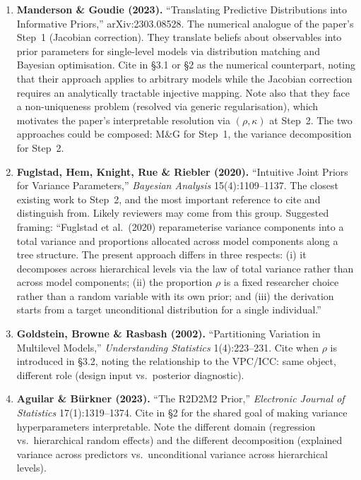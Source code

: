 \documentclass[12pt,a4paper]{article}
\begin{document}
\begin{enumerate}
  \item \textbf{Manderson \& Goudie (2023).} ``Translating Predictive
    Distributions into Informative Priors,'' arXiv:2303.08528. The numerical
    analogue of the paper's Step~1 (Jacobian correction). They translate
    beliefs about observables into prior parameters for single-level models via
    distribution matching and Bayesian optimisation. Cite in \S3.1 or \S2 as
    the numerical counterpart, noting that their approach applies to arbitrary
    models while the Jacobian correction requires an analytically tractable
    injective mapping. Note also that they face a non-uniqueness problem
    (resolved via generic regularisation), which motivates the paper's
    interpretable resolution via $(\rho, \kappa)$ at Step~2. The two
    approaches could be composed: M\&G for Step~1, the variance decomposition
    for Step~2.

  \item \textbf{Fuglstad, Hem, Knight, Rue \& Riebler (2020).} ``Intuitive
    Joint Priors for Variance Parameters,'' \emph{Bayesian Analysis}
    15(4):1109--1137. The closest existing work to Step~2, and the most
    important reference to cite and distinguish from. Likely reviewers may come
    from this group. Suggested framing: ``Fuglstad et al.\ (2020)
    reparameterise variance components into a total variance and proportions
    allocated across model components along a tree structure. The present
    approach differs in three respects: (i) it decomposes across hierarchical
    levels via the law of total variance rather than across model components;
    (ii) the proportion $\rho$ is a fixed researcher choice rather than a
    random variable with its own prior; and (iii) the derivation starts from a
    target unconditional distribution for a single individual.''

  \item \textbf{Goldstein, Browne \& Rasbash (2002).} ``Partitioning Variation
    in Multilevel Models,'' \emph{Understanding Statistics} 1(4):223--231. Cite
    when $\rho$ is introduced in \S3.2, noting the relationship to the VPC/ICC:
    same object, different role (design input vs.\ posterior diagnostic).

  \item \textbf{Aguilar \& B\"{u}rkner (2023).} ``The R2D2M2 Prior,''
    \emph{Electronic Journal of Statistics} 17(1):1319--1374. Cite in \S2 for
    the shared goal of making variance hyperparameters interpretable. Note the
    different domain (regression vs.\ hierarchical random effects) and the
    different decomposition (explained variance across predictors vs.\
    unconditional variance across hierarchical levels).


\end{enumerate}
\end{document}
